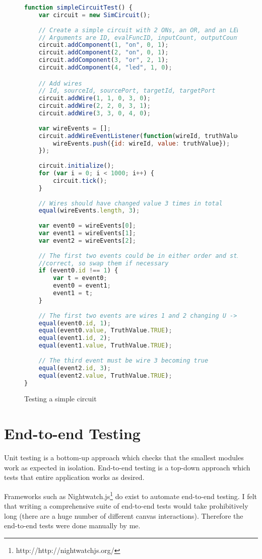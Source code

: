 \begin{figure}
\begin{lstlisting}[language=JavaScript]
function simpleCircuitTest() {
	var circuit = new SimCircuit();
	
	// Create a simple circuit with 2 ONs, an OR, and an LED
	// Arguments are ID, evalFuncID, inputCount, outputCount
	circuit.addComponent(1, "on", 0, 1);
	circuit.addComponent(2, "on", 0, 1);
	circuit.addComponent(3, "or", 2, 1);
	circuit.addComponent(4, "led", 1, 0);

	// Add wires
	// Id, sourceId, sourcePort, targetId, targetPort
	circuit.addWire(1, 1, 0, 3, 0);
	circuit.addWire(2, 2, 0, 3, 1);
	circuit.addWire(3, 3, 0, 4, 0);
	
	var wireEvents = [];
	circuit.addWireEventListener(function(wireId, truthValue) {
		wireEvents.push({id: wireId, value: truthValue});
	});
	
	circuit.initialize();
	for (var i = 0; i < 1000; i++) {
		circuit.tick();
	}
	
	// Wires should have changed value 3 times in total
	equal(wireEvents.length, 3);
	
	var event0 = wireEvents[0];
	var event1 = wireEvents[1];
	var event2 = wireEvents[2];
	
	// The first two events could be in either order and still be 
	//correct, so swap them if necessary
	if (event0.id !== 1) {
		var t = event0;
		event0 = event1;
		event1 = t;
	}
	
	// The first two events are wires 1 and 2 changing U -> T	
	equal(event0.id, 1);
	equal(event0.value, TruthValue.TRUE);
	equal(event1.id, 2);
	equal(event1.value, TruthValue.TRUE);
	
	// The third event must be wire 3 becoming true
	equal(event2.id, 3);
	equal(event2.value, TruthValue.TRUE);
}
\end{lstlisting}
\caption{Testing a simple circuit}
\label{fig:circuittest}
\end{figure}

\section{End-to-end Testing}
Unit testing is a bottom-up approach which checks that the smallest modules work as expected in isolation. End-to-end testing is a top-down approach which tests that entire application works as desired.

Frameworks such as Nightwatch.js\footnote{http://http://nightwatchjs.org/} do exist to automate end-to-end testing. I felt that writing a comprehensive suite of end-to-end tests would take prohibitively long (there are a huge number of different canvas interactions). Therefore the end-to-end tests were done manually by me.

